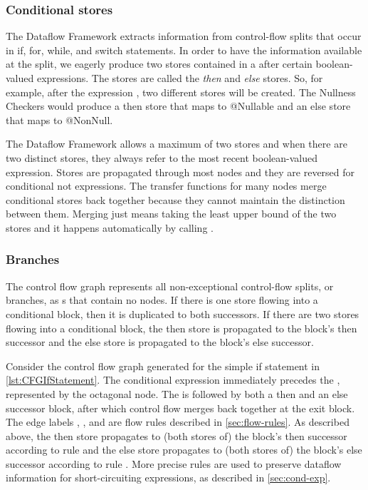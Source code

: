 

\subsubsection{Conditional stores}
\label{sec:cond-stores}

The Dataflow Framework extracts information from control-flow splits
that occur in if, for, while, and switch statements.  In order to have
the information available at the split, we eagerly produce two stores
contained in a  after certain
boolean-valued expressions.  The stores are called the \emph{then} and
\emph{else} stores.  So, for example, after the expression , two different stores will be created.  The Nullness Checkers
would produce a then store that maps  to @Nullable and an else
store that maps  to @NonNull.

The Dataflow Framework allows a maximum of two stores and when there
are two distinct stores, they always refer to the most recent
boolean-valued expression.  Stores are propagated through most nodes
and they are reversed for conditional not expressions.  The transfer
functions for many nodes merge conditional stores back together
because they cannot maintain the distinction between them.  Merging
just means taking the least upper bound of the two stores and it
happens automatically by calling .


\subsubsection{Branches}

The control flow graph represents all non-exceptional control-flow
splits, or branches, as s that contain no
nodes.  If there is one store flowing into a conditional block, then
it is duplicated to both successors.  If there are two stores flowing
into a conditional block, the then store is propagated to the block's
then successor and the else store is propagated to the block's else
successor.

Consider the control flow graph generated for the simple if statement
in \autoref{lst:CFGIfStatement}.  The conditional expression 
immediately precedes the , represented by the
octagonal node.  The  is followed by both a
then and an else successor block, after which control flow merges back
together at the exit block.  The edge labels ,
, and  are flow rules described
in \autoref{sec:flow-rules}.  As described above, the then store
propagates to (both stores of) the block's then successor according to
rule  and the else store propagates to (both stores
of) the block's else successor according to rule .
More precise rules are used to preserve dataflow information for
short-circuiting expressions, as described in \autoref{sec:cond-exp}.

